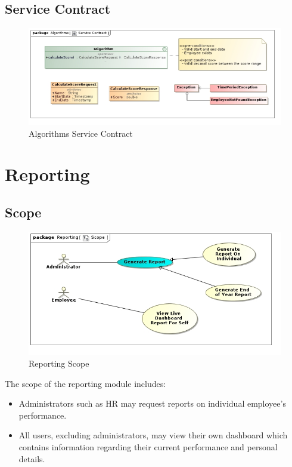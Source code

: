 \documentclass[11pt,a4paper]{article}
\begin{document}
\subsection{Service Contract}
\begin{figure}[H]
	\begin{center}
		\includegraphics[scale=0.5]{../Images/Algorithms_Service_Contract.jpg}
		\caption{Algorithms Service Contract}
	\end{center}
\end{figure}

\pagebreak

\section{Reporting}
\subsection{Scope}
\begin{figure}[H]
	\begin{center}
		\includegraphics[scale=0.75]{../Images/Reporting Scope.jpg}
		\caption{Reporting Scope}
	\end{center}
\end{figure}
The scope of the reporting module includes:
\begin{itemize}
	\item Administrators such as HR may request reports on individual employee's performance.
	\item All users, excluding administrators, may view their own dashboard which contains information regarding their current performance and personal details.
\end{itemize}
\end{document}
